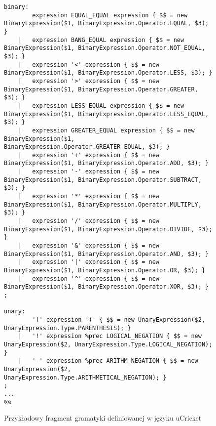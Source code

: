 \begin{figure}
\begin{lstlisting}
binary:
        expression EQUAL_EQUAL expression { $$ = new BinaryExpression($1, BinaryExpression.Operator.EQUAL, $3); }
    |   expression BANG_EQUAL expression { $$ = new BinaryExpression($1, BinaryExpression.Operator.NOT_EQUAL, $3); }
    |   expression '<' expression { $$ = new BinaryExpression($1, BinaryExpression.Operator.LESS, $3); }
    |   expression '>' expression { $$ = new BinaryExpression($1, BinaryExpression.Operator.GREATER, $3); }
    |   expression LESS_EQUAL expression { $$ = new BinaryExpression($1, BinaryExpression.Operator.LESS_EQUAL, $3); }
    |   expression GREATER_EQUAL expression { $$ = new BinaryExpression($1, BinaryExpression.Operator.GREATER_EQUAL, $3); }
    |   expression '+' expression { $$ = new BinaryExpression($1, BinaryExpression.Operator.ADD, $3); }
    |   expression '-' expression { $$ = new BinaryExpression($1, BinaryExpression.Operator.SUBTRACT, $3); }
    |   expression '*' expression { $$ = new BinaryExpression($1, BinaryExpression.Operator.MULTIPLY, $3); }
    |   expression '/' expression { $$ = new BinaryExpression($1, BinaryExpression.Operator.DIVIDE, $3); }
    |   expression '&' expression { $$ = new BinaryExpression($1, BinaryExpression.Operator.AND, $3); }
    |   expression '|' expression { $$ = new BinaryExpression($1, BinaryExpression.Operator.OR, $3); }
    |   expression '^' expression { $$ = new BinaryExpression($1, BinaryExpression.Operator.XOR, $3); }
;

unary:
        '(' expression ')' { $$ = new UnaryExpression($2, UnaryExpression.Type.PARENTHESIS); }
    |   '!' expression %prec LOGICAL_NEGATION { $$ = new UnaryExpression($2, UnaryExpression.Type.LOGICAL_NEGATION); }
    |   '-' expression %prec ARITHM_NEGATION { $$ = new UnaryExpression($2, UnaryExpression.Type.ARITHMETICAL_NEGATION); }
;
...
%%
\end{lstlisting}
\caption{Przykładowy fragment gramatyki definiowanej w języku uCricket}
\label{fig:lst:parser-gramatyka}
\end{figure}


